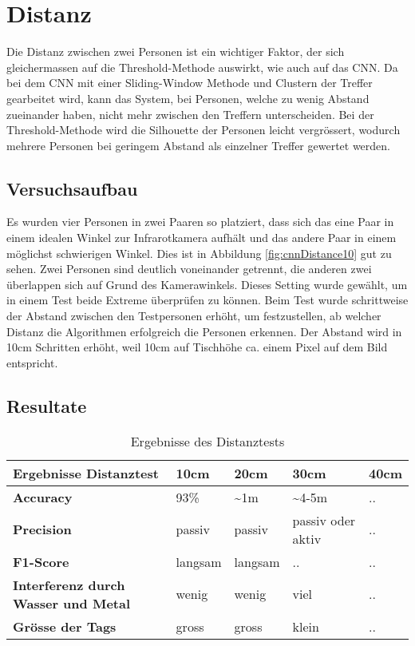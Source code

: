 \section{Distanz}
\label{sec:distanz}

Die Distanz zwischen zwei Personen ist ein wichtiger Faktor, der sich gleichermassen auf die Threshold-Methode auswirkt, wie auch auf das \gls{CNN}. Da bei dem \gls{CNN} mit einer Sliding-Window Methode und Clustern der Treffer gearbeitet wird, kann das System, bei Personen, welche zu wenig Abstand zueinander haben, nicht mehr zwischen den Treffern unterscheiden. Bei der Threshold-Methode wird die Silhouette der Personen leicht vergrössert, wodurch mehrere Personen bei geringem Abstand als einzelner Treffer gewertet werden.

\subsection{Versuchsaufbau}

Es wurden vier Personen in zwei Paaren so platziert, dass sich das eine Paar in einem idealen Winkel zur Infrarotkamera aufhält und das andere Paar in einem möglichst schwierigen Winkel. Dies ist in Abbildung \ref{fig:cnnDistance10} gut zu sehen. Zwei Personen sind deutlich voneinander getrennt, die anderen zwei überlappen sich auf Grund des Kamerawinkels. Dieses Setting wurde gewählt, um in einem Test beide Extreme überprüfen zu können. 
Beim Test wurde schrittweise der Abstand zwischen den Testpersonen erhöht, um festzustellen, ab welcher Distanz die Algorithmen erfolgreich die Personen erkennen. Der Abstand wird in 10cm Schritten erhöht, weil 10cm auf Tischhöhe ca. einem Pixel auf dem Bild entspricht.

\subsection{Resultate}

\begin{table}[H]
	\begin{tabularx}{\textwidth}{|X|X|X|X|X|}
		\hline
		\textbf{Ergebnisse Distanztest} & \textbf{10cm} & \textbf{20cm} & \textbf{30cm} & \textbf{40cm}\\
		\hline 
		\textbf{Accuracy} & 93\% & \textasciitilde 1m & \textasciitilde 4-5m & ..\\
		\hline  
		\textbf{Precision} & passiv & passiv & passiv oder aktiv & ..\\
		\hline
		\textbf{F1-Score} & langsam & langsam & .. & ..\\
		\hline
		\textbf{Interferenz durch Wasser und Metal} & wenig & wenig & viel & ..\\
		\hline
		\textbf{Grösse der Tags} & gross & gross & klein & ..\\
		\hline
	\end{tabularx}
	\caption{Ergebnisse des Distanztests}
	\label{tbl:distance}
\end{table}

